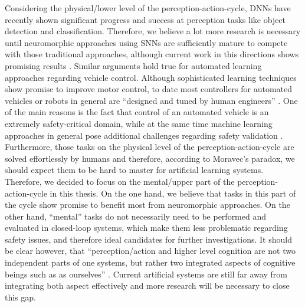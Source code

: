 Considering the physical/lower level of the perception-action-cycle, \acp{DNN} have recently shown significant progress and success at perception tasks like object detection and classification.
Therefore, we believe a lot more research is necessary until neuromorphic approaches using \acp{SNN} are sufficiently mature to compete with those traditional approaches, although current work in this directions shows promising results \parencite{Hunsberger2015}.
Similar arguments hold true for automated learning approaches regarding vehicle control.
Although sophisticated learning techniques show promise to improve motor control, to date most controllers for automated vehicles or robots in general are \enquote{designed and tuned by human engineers} \parencite{Deisenroth2013}.
One of the main reasons is the fact that control of an automated vehicle is an extremely safety-critical domain, while at the same time machine learning approaches in general pose additional challenges regarding safety validation \parencite{Koopman2016}.
Furthermore, those tasks on the physical level of the perception-action-cycle are solved effortlessly by humans and therefore, according to Moravec's paradox, we should expect them to be hard to master for artificial learning systems.
Therefore, we decided to focus on the mental/upper part of the perception-action-cycle in this thesis.
On the one hand, we believe that tasks in this part of the cycle show promise to benefit most from neuromorphic approaches.
On the other hand, \enquote{mental} tasks do not necessarily need to be performed and evaluated in closed-loop systems, which make them less problematic regarding safety issues, and therefore ideal candidates for further investigations.
It should be clear however, that \enquote{perception/action and higher level cognition are not two independent parts of one systems, but rather two integrated aspects of cognitive beings such as as ourselves} \parencite{Eliasmith2013}.
Current artificial systems are still far away from integrating both aspect effectively and more research will be necessary to close this gap.

